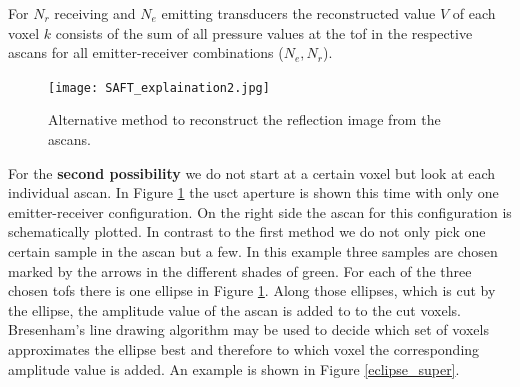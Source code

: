 For ${N_r}$ receiving and ${N_e}$ emitting transducers the reconstructed value $V$ of each voxel $k$ consists of the sum of all pressure values at the \ac{tof} in the respective \acp{ascan} for all emitter-receiver combinations ($N_e, N_r$). 

\bigskip
\bigskip

\begin{figure}[H]
    \centering
    \texttt{[image: SAFT\_explaination2.jpg]}
    \caption{ Alternative method to reconstruct the reflection image from the \acp{ascan}. }
    \label{SAFT_explain2}
\end{figure}


For the \textbf{second possibility} we do not start at a certain voxel but look at each individual \ac{ascan}. In Figure \ref{SAFT_explain2} the \ac{usct} aperture is shown this time with only one emitter-receiver configuration. On the right side the \ac{ascan} for this configuration is schematically plotted.
In contrast to the first method we do not only pick one certain sample in the \ac{ascan} but a few. In this example three samples are chosen marked by the arrows in the different shades of green. For each of the three chosen \acp{tof} there is one ellipse in Figure \ref{SAFT_explain2}. Along those ellipses, which is cut by the ellipse, the amplitude value of the \ac{ascan} is added to to the cut voxels. Bresenham's line drawing algorithm \cite{Bresenham2010AlgorithmPlotter} may be used to decide which set of voxels approximates the ellipse best and therefore to which voxel the corresponding amplitude value is added. An example is shown in Figure \ref{eclipse_super}.






